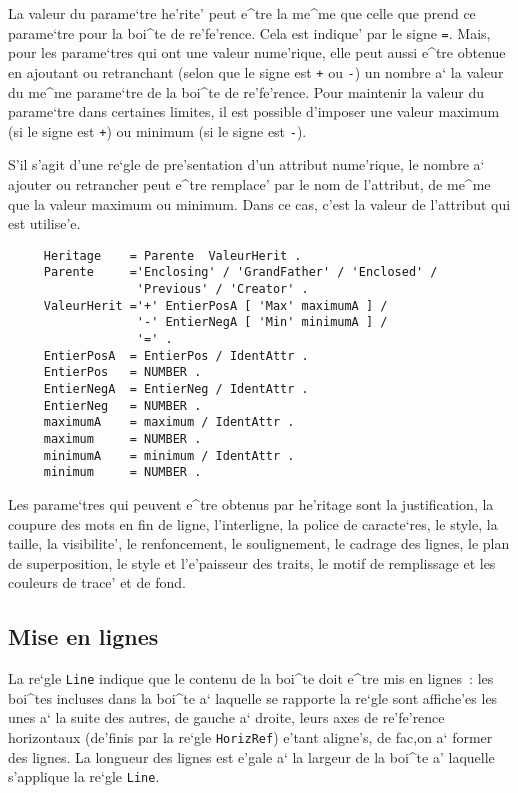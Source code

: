 {La valeur du parame`tre he'rite' peut e^tre la me^me que celle que prend ce parame`tre
pour la boi^te de re'fe'rence. Cela est indique' par le signe {\tt =}.
Mais, pour les parame`tres qui ont une valeur nume'rique, elle peut aussi
e^tre obtenue en ajoutant ou retranchant (selon que le signe est {\tt +}
ou {\tt -}) un nombre a` la valeur du me^me parame`tre de la boi^te
de re'fe'rence. Pour maintenir la valeur du parame`tre dans certaines limites,
il est possible d'imposer une valeur maximum (si le signe est {\tt +})
ou minimum (si le signe est {\tt -}).

S'il s'agit d'une re`gle de pre'sentation d'un attribut nume'rique, le nombre
a` ajouter ou retrancher peut e^tre remplace' par le nom de l'attribut, de
me^me que la valeur maximum ou minimum. Dans ce cas, c'est la valeur de
l'attribut qui est utilise'e.

\begin{verbatim}
     Heritage    = Parente  ValeurHerit .
     Parente     ='Enclosing' / 'GrandFather' / 'Enclosed' /
                  'Previous' / 'Creator' .
     ValeurHerit ='+' EntierPosA [ 'Max' maximumA ] /
                  '-' EntierNegA [ 'Min' minimumA ] /
                  '=' .
     EntierPosA  = EntierPos / IdentAttr .
     EntierPos   = NUMBER .
     EntierNegA  = EntierNeg / IdentAttr .
     EntierNeg   = NUMBER .
     maximumA    = maximum / IdentAttr .
     maximum     = NUMBER .
     minimumA    = minimum / IdentAttr .
     minimum     = NUMBER .
\end{verbatim}

Les parame`tres qui peuvent e^tre obtenus par he'ritage sont la justification,
la coupure des mots en fin de ligne,
l'interligne, la police de caracte`res, le style, la taille, la visibilite',
le renfoncement, le soulignement, le cadrage des lignes, le plan de
superposition, le style et l'e'paisseur des traits, le motif de remplissage et
les couleurs de trace' et de fond.

\subsection{Mise en lignes}
\label{regleline}

La re`gle {\tt Line} indique que le contenu de la boi^te doit e^tre mis
en lignes~: les boi^tes incluses dans la boi^te a` laquelle se rapporte la
re`gle sont affiche'es les unes a` la suite des autres, de gauche a` droite,
leurs axes de re'fe'rence horizontaux (de'finis par la re`gle {\tt HorizRef})
e'tant aligne's, de fac,on a` former des lignes. La longueur des lignes est
e'gale a` la largeur de la boi^te a' laquelle s'applique la re`gle {\tt Line}.

}
